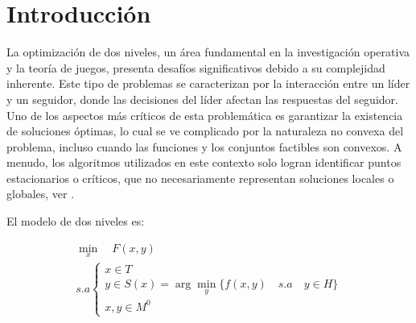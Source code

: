 \chapter{Introducción}
La optimización de dos niveles, un área fundamental en la investigación operativa y la teoría de juegos, presenta desafíos significativos debido a su complejidad inherente. Este tipo de problemas se caracterizan por la interacción entre un líder y un seguidor, donde las decisiones del líder afectan las respuestas del seguidor. Uno de los aspectos más críticos de esta problemática es garantizar la existencia de soluciones óptimas, lo cual se ve complicado por la naturaleza no convexa del problema, incluso cuando las funciones y los conjuntos factibles son convexos. A menudo, los algoritmos utilizados en este contexto solo logran identificar puntos estacionarios o críticos, que no necesariamente representan soluciones locales o globales, ver \cite{DempeyZemkoho2020}.


El modelo de dos niveles es:

\begin{equation*} 
    \begin{array}{l}
       \min_x \quad F(x, y)\\
        s.a \left\{ \begin{array}{l}
            x \in T \\
             y \in S(x) = \arg  \min_y \{ f(x, y) \quad s.a \quad y \in  H \}\\
            x,y \in M^0 
        \end{array}\right.
        \end{array} \end{equation*}

